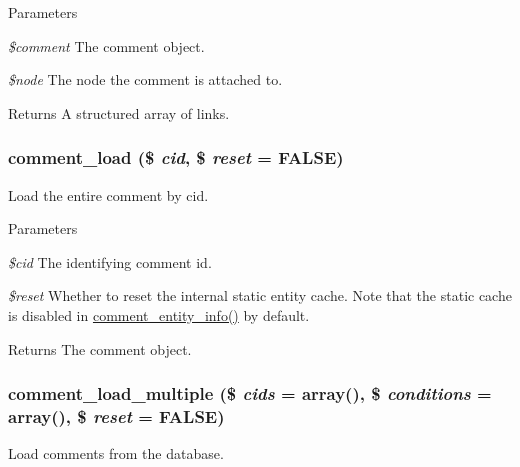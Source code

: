 \begin{DoxyParams}{Parameters}
\item[{\em \$comment}]The comment object. \item[{\em \$node}]The node the comment is attached to. \end{DoxyParams}
\begin{DoxyReturn}{Returns}
A structured array of links. 
\end{DoxyReturn}
\hypertarget{comment_8module_ac1c8a5b8709abdfce125d928a4381c7e}{
\subsubsection[{comment\_\-load}]{\setlength{\rightskip}{0pt plus 5cm}comment\_\-load (\$ {\em cid}, \/  \$ {\em reset} = {\ttfamily FALSE})}}
\label{comment_8module_ac1c8a5b8709abdfce125d928a4381c7e}
Load the entire comment by cid.


\begin{DoxyParams}{Parameters}
\item[{\em \$cid}]The identifying comment id. \item[{\em \$reset}]Whether to reset the internal static entity cache. Note that the static cache is disabled in \hyperlink{comment_8module_a4cdb7636ced52ebf5d0af7dd42ca83d1}{comment\_\-entity\_\-info()} by default.\end{DoxyParams}
\begin{DoxyReturn}{Returns}
The comment object. 
\end{DoxyReturn}
\hypertarget{comment_8module_a0cfb98e73c618190693b683c9bbfc0b1}{
\subsubsection[{comment\_\-load\_\-multiple}]{\setlength{\rightskip}{0pt plus 5cm}comment\_\-load\_\-multiple (\$ {\em cids} = {\ttfamily array()}, \/  \$ {\em conditions} = {\ttfamily array()}, \/  \$ {\em reset} = {\ttfamily FALSE})}}
\label{comment_8module_a0cfb98e73c618190693b683c9bbfc0b1}
Load comments from the database.


